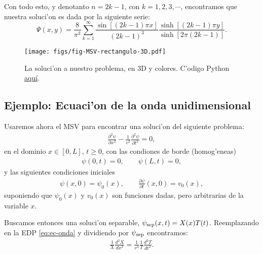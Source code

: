 Con todo esto, y denotanto $n=2k-1$, con $k=1,2,3,\cdots$, encontramos que nuestra soluci'on es dada por la siguiente serie:
\begin{equation}
\Psi(x,y)=\frac{8}{\pi^3}\sum_{k=1}^{\infty}\frac{\sin[(2k-1) \pi x]}{(2k-1)^3}\frac{\sinh[(2k-1)\pi y]}{\sinh[2\pi (2k-1)]}.
\end{equation}

\begin{figure}[H]
\centering
\texttt{[image: figs/fig-MSV-rectangulo-3D.pdf]}
\caption{La soluci'on a nuestro problema, en 3D y colores. C'odigo Python \href{https://github.com/gfrubi/FM2/blob/master/figuras-editables/fig-MSV-Laplace-rectangulo.py}{aqu\'i}.}
\label{fig-SolLap}
\end{figure}

\subsection{Ejemplo: Ecuaci'on de la onda unidimensional}
Usaremos ahora el MSV para encontrar una soluci'on del siguiente problema:
\begin{align}
\frac{\partial^2 \psi}{\partial x^2}-\frac{1}{v^2}\frac{\partial^2 \psi}{\partial t^2}=0,\label{eq:ec-onda}
\end{align}
en el dominio $x\in[0,L]$, $t\ge 0$, con las condiones de borde (homog'eneas)
\begin{align}
\psi(0,t)=0,\qquad \psi(L,t)=0,\label{eq:cond-borde}
\end{align}
y las siguientes condiciones iniciales 
\begin{align}
\psi(x,0)=\psi_{0}(x),\qquad \frac{\partial \psi}{\partial t}(x,0)=v_{0}(x),\label{eq:cond-inicial}
\end{align}
suponiendo que $\psi_{0}(x)$ y $v_{0}(x)$ son funciones dadas, pero arbitrarias de la variable $x$.


Buscamos entonces una soluci'on separable, $\psi_{\rm sep}(x,t) = X(x)T(t)$. Reemplazando en la EDP \eqref{eq:ec-onda} y dividiendo por $\psi_{\rm sep}$ encontramos:
\begin{align}
\frac{1}{X}\frac{d^2 X}{dx^2}=\frac{1}{v^2}\frac{1}{T}\frac{d^2 T}{dt^2}.\label{eq:ec-separable}
\end{align} 

